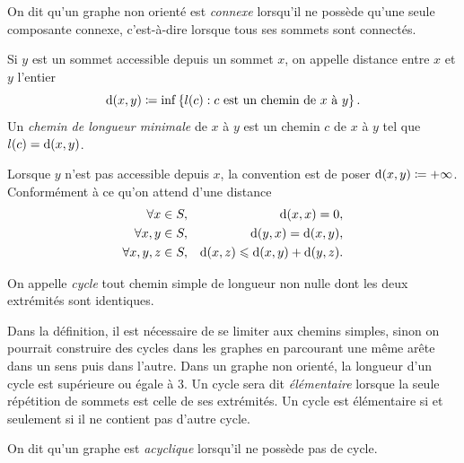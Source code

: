 \documentclass{magnolia}
\begin{document}
\begin{definition}
On dit qu'un graphe non orienté est \emph{connexe} lorsqu'il ne possède qu'une seule
composante connexe, c'est-à-dire lorsque tous ses sommets sont connectés.
\end{definition}

\begin{definition}
Si $y$ est un sommet accessible depuis un sommet $x$, on appelle distance entre $x$ et
$y$ l'entier
\[{\rm d}(x, y) \defeq \inf \ensim{l(c)}{c
      \textnormal{ est un chemin de } x \textnormal{ à } y}.\]
Un \emph{chemin de longueur minimale} de $x$ à $y$ est un chemin $c$
de $x$ à $y$ tel que $l(c) = {\rm d}(x, y)$.
\end{definition}

\begin{remarques}
\remarque Lorsque $y$ n'est pas accessible depuis $x$, la convention est de poser
  ${\rm d}(x, y)\defeq +\infty$.
\remarque Conformément à ce qu'on attend d'une distance
  \begin{eqnarray*}
  \forall x\in S,& & {\rm d}(x, x)=0,\\
  \forall x,y\in S,& & {\rm d}(y, x)={\rm d}(x, y),\\
  \forall x,y,z\in S,& & {\rm d}(x, z)\leq {\rm d}(x, y)+{\rm d}(y, z).\\
  \end{eqnarray*}
\end{remarques}

\begin{definition}
On appelle \emph{cycle} tout chemin simple de longueur non nulle dont les deux
extrémités sont identiques.
\end{definition}
  
\begin{remarques}
\remarque Dans la définition, il est nécessaire de se limiter aux chemins simples, sinon
  on pourrait construire des \og cycles \fg dans les graphes 
  en parcourant une même arête dans un sens puis dans l'autre.
\remarque Dans un graphe non orienté, la longueur d'un cycle est supérieure ou égale à 3.
\remarque Un cycle sera dit \emph{élémentaire} lorsque la seule répétition de sommets est celle de
  ses extrémités. Un cycle est élémentaire si et seulement si il ne contient pas
  d'autre cycle.
\item On dit qu'un graphe est \emph{acyclique} lorsqu'il ne possède pas de cycle.
\end{remarques}
\end{document}
